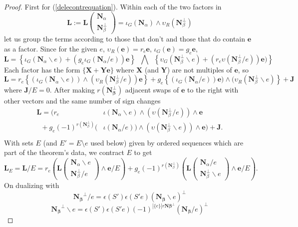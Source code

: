 \documentclass[Unicode]{cedram-alco}
\newcommand{\ext}[1]{\ensuremath{\mathbf{#1}}}
\newcommand{\eNal}{\ensuremath{\ext{N}_{\alpha}}}
\newcommand{\eNbePe}{\ensuremath{\ext{N}_{\beta}^{\perp}}}
\newcommand{\Is}{\ensuremath{\iota}}
\newcommand{\Vs}{\ensuremath{\upsilon}}
\begin{document}
\begin{proof}

First for (\ref{delecontrequation}). Within each of the two factors in
  \[
   \ext{L} := \ext{L}\left( \begin{array}{c} \eNal\\ \eNbePe \end{array} \right)
=\Is_G(\eNal)\wedge\Vs_R(\eNbePe)
  \]
let us group the terms according to those that don't and those that do
contain $\ext{e}$ as a factor.   Since for the given $e$, 
  $\Vs_R(\ext{e})=r_e\ext{e}$, $\Is_G(\ext{e})=g_e\ext{e}$,
\[
\ext{L} =
\left\{\Is_G(\eNal \backslash e) + (g_e\Is_G(\eNal/e))\ext{e}\right\}
\;\;\bigwedge\;\;
\left\{\Vs_G(\eNbePe\backslash e) + (r_e\Vs(\eNbePe/e))\ext{e})\right\}  
\]
Each factor has the form $\{\ext{X} + \ext{Y}\ext{e}\}$ where
$\ext{X}$ (and $\ext{Y}$) are not multiples of $\ext{e}$, so
\[
\ext{L}=
r_e\left\{ (\Is_G(\eNal\backslash e))\wedge (\Vs_R(\eNbePe/e))\ext{e} \right\}  +
g_e\left\{ (\Is_G(\eNal/e))\ext{e})  \wedge (\Vs_R(\eNbePe\backslash e)\right\}
+\ext{J}
\]
where $\ext{J}/E = 0$.
After making $r(\ext{N_\beta^\perp})$ adjacent swaps of $\ext{e}$ to the right with other
vectors and the same number of sign changes
\[
\begin{split} 
   \ext{L} = \Big( r_e  \;\;\; \;\;\;\;\;\;\;\;\;\;\;\;\;\; & \Is(\eNal\backslash e)  \wedge (\Vs(\eNbePe/e))      \wedge  \ext{e} \\
   \;\;+ g_e (-1)^{r(\eNbePe)} ( & \Is(\eNal/e))\wedge(\Vs(\eNbePe\backslash e))   \wedge  \ext{e}\Big)
+\ext{J}.\\
\end{split}
\]
With sets $E$ (and $E'=E\setminus e$ used below) given by ordered sequences
which are part of the theorem's data, we contract $E$ to get
\[
\ext{L}_E=\ext{L}/E = r_e\left(\ext{L}\left(\begin{array}{c} \eNal\backslash e \\
    \eNbePe/e  \end{array} \right)  \wedge \ext{e} /E \right) +
   g_e(-1)^{r(\eNbePe)}\left(\ext{L}\left(\begin{array}{c} \eNal /e \\
    \eNbePe \backslash e \end{array} \right) \wedge \ext{e} /E \right).
   \]
On dualizing with
   \[
     \ext{N_\beta}^\perp/e  = \epsilon(S')\epsilon(S'e) (\ext{N_\beta}\backslash e)^\perp
     \]
     \[
       \ext{N_\beta}^\perp\backslash e = \epsilon(S')\epsilon(S'e)(-1)^{|\{e\}|r\ext{N\beta}^\perp}(\ext{N_\beta}/e)^\perp
\]
\end{proof}
\end{document}
